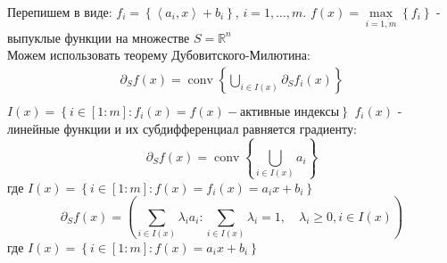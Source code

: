 \documentclass[12pt,letterpaper]{article}
\begin{document}
Перепишем в виде: $ f_i = \left\{\left\langle a_{i}, x\right\rangle+b_{i}\right\} $, $ i=1, \ldots, m $. $ f(x) = \max\limits _{i = \overline{1,m}}\left\{ f_i \right\}$ - выпуклые функции на множестве $ S = \mathbb{R}^n $\\
Можем использовать теорему Дубовитского-Милютина:
$$
\begin{array}{l}
\partial_{S} f\left(x\right)=\operatorname{conv}\left\{\bigcup_{i \in I\left(x\right)} \partial_{S} f_{i}\left(x\right)\right\} \\
\end{array}
$$
$I(x)=\left\{i \in[1: m]: f_{i}(x)=f(x) - \text{активные индексы}\right\}$
$ f_i(x) $ - линейные функции и их субдифференциал равняется градиенту: 
$$
\partial_{S} f\left(x\right)=\operatorname{conv}\left\{\bigcup_{i \in I\left(x\right)} a_i\right\}
$$
где $ I(x)=\left\{i \in[1: m]: f(x)=f_{i}(x)= a_i x + b_i \right\} $
$$
\partial_{S} f\left(x\right) = \left(\sum_{i \in I(x)} \lambda_{i} a_{i}: \sum_{i \in I(x)} \lambda_{i}=1, \quad \lambda_{i} \geq 0, i \in I(x)\right)
$$
где $ I(x)=\left\{i \in[1: m]: f(x)= a_i x + b_i \right\} $
\end{document}
